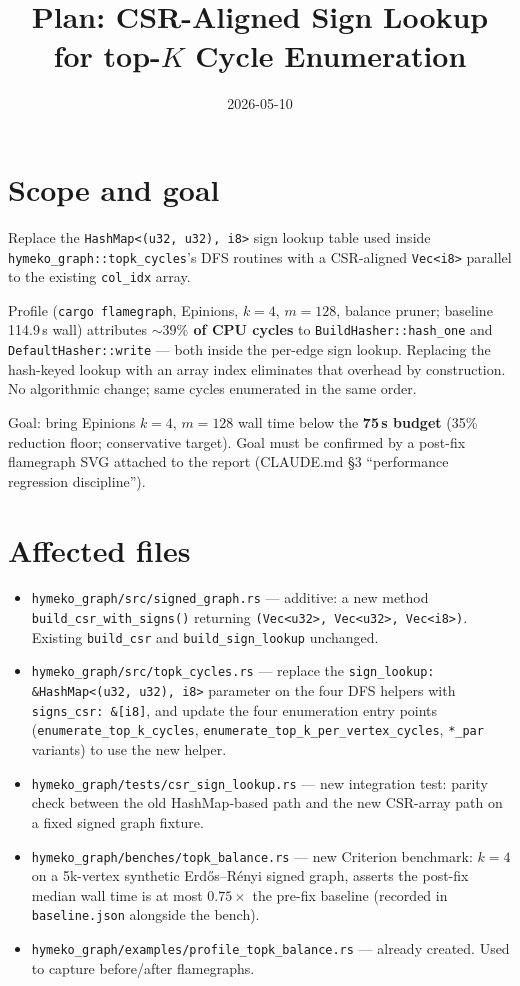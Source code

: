 \documentclass[a4paper,11pt]{article}
\title{Plan: CSR-Aligned Sign Lookup for top-$K$ Cycle Enumeration}
\author{}
\date{2026-05-10}
\begin{document}
\maketitle

\section*{Scope and goal}

Replace the \texttt{HashMap<(u32, u32), i8>} sign lookup table used inside
\texttt{hymeko\_graph::topk\_cycles}'s DFS routines with a CSR-aligned
\texttt{Vec<i8>} parallel to the existing \texttt{col\_idx} array.

Profile (\texttt{cargo flamegraph}, Epinions, $k{=}4$, $m{=}128$, balance
pruner; baseline 114.9\,s wall) attributes
\textbf{$\sim 39\%$ of CPU cycles} to
\texttt{BuildHasher::hash\_one} and
\texttt{DefaultHasher::write} — both inside the per-edge sign lookup.
Replacing the hash-keyed lookup with an array index eliminates that
overhead by construction. No algorithmic change; same cycles enumerated
in the same order.

Goal: bring Epinions $k{=}4$, $m{=}128$ wall time below the
\textbf{75\,s budget} (35\% reduction floor; conservative target).
Goal must be confirmed by a post-fix flamegraph SVG attached to the
report (CLAUDE.md \S3 ``performance regression discipline'').

\section*{Affected files}

\begin{itemize}
  \item \texttt{hymeko\_graph/src/signed\_graph.rs} — additive: a new
    method \texttt{build\_csr\_with\_signs()} returning
    \texttt{(Vec<u32>, Vec<u32>, Vec<i8>)}. Existing \texttt{build\_csr}
    and \texttt{build\_sign\_lookup} unchanged.
  \item \texttt{hymeko\_graph/src/topk\_cycles.rs} — replace the
    \texttt{sign\_lookup: \&HashMap<(u32, u32), i8>} parameter on the
    four DFS helpers with \texttt{signs\_csr: \&[i8]}, and update the
    four enumeration entry points
    (\texttt{enumerate\_top\_k\_cycles},
    \texttt{enumerate\_top\_k\_per\_vertex\_cycles},
    \texttt{*\_par} variants) to use the new helper.
  \item \texttt{hymeko\_graph/tests/csr\_sign\_lookup.rs} — new
    integration test: parity check between the old HashMap-based path
    and the new CSR-array path on a fixed signed graph fixture.
  \item \texttt{hymeko\_graph/benches/topk\_balance.rs} — new Criterion
    benchmark: $k{=}4$ on a 5k-vertex synthetic Erdős–Rényi signed
    graph, asserts the post-fix median wall time is at most
    $0.75\times$ the pre-fix baseline (recorded in
    \texttt{baseline.json} alongside the bench).
  \item \texttt{hymeko\_graph/examples/profile\_topk\_balance.rs} —
    already created. Used to capture before/after flamegraphs.
\end{itemize}
\end{document}
